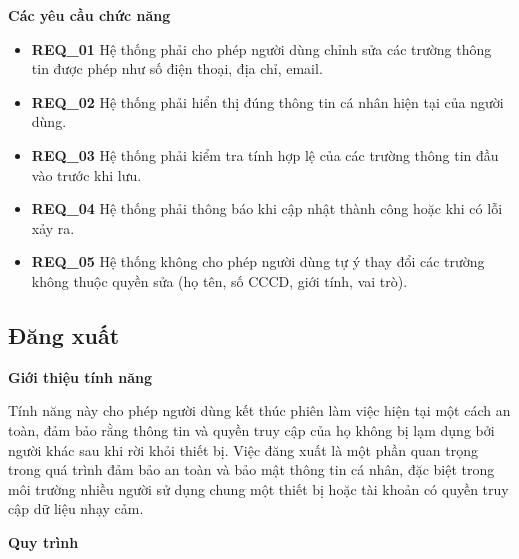 \noindent \textbf{Các yêu cầu chức năng}

\begin{itemize}

\item \textbf{REQ\_01} Hệ thống phải cho phép người dùng chỉnh sửa các trường thông tin được phép như số điện thoại, địa chỉ, email.

\item \textbf{REQ\_02} Hệ thống phải hiển thị đúng thông tin cá nhân hiện tại của người dùng.

\item \textbf{REQ\_03} Hệ thống phải kiểm tra tính hợp lệ của các trường thông tin đầu vào trước khi lưu.

\item \textbf{REQ\_04} Hệ thống phải thông báo khi cập nhật thành công hoặc khi có lỗi xảy ra.

\item \textbf{REQ\_05} Hệ thống không cho phép người dùng tự ý thay đổi các trường không thuộc quyền sửa (họ tên, số CCCD, giới tính, vai trò).

\end{itemize}

\subsection{Đăng xuất}

\noindent \textbf{Giới thiệu tính năng}

Tính năng này cho phép người dùng kết thúc phiên làm việc hiện tại một cách an toàn, đảm bảo rằng thông tin và quyền truy cập của họ không bị lạm dụng bởi người khác sau khi rời khỏi thiết bị. Việc đăng xuất là một phần quan trọng trong quá trình đảm bảo an toàn và bảo mật thông tin cá nhân, đặc biệt trong môi trường nhiều người sử dụng chung một thiết bị hoặc tài khoản có quyền truy cập dữ liệu nhạy cảm.

\noindent \textbf{Quy trình}


